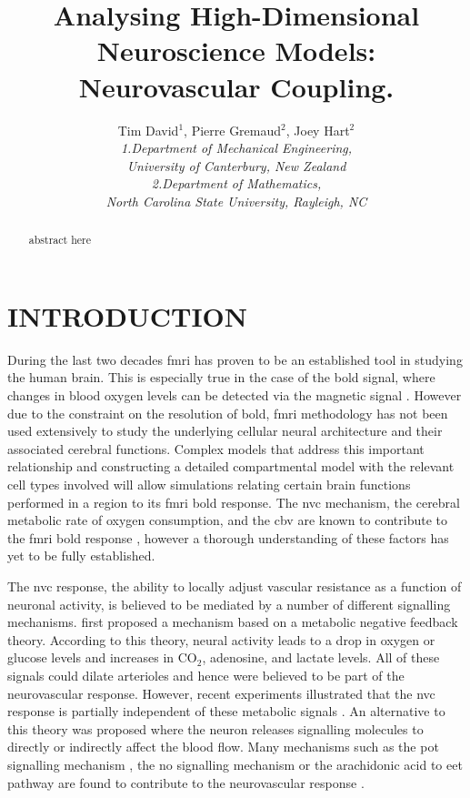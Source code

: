 \documentclass[12pt]{article}
\numberwithin{equation}{section}
\begin{document}
\title{Analysing High-Dimensional Neuroscience Models: Neurovascular Coupling. }
\author{ Tim David$^{1}$, Pierre Gremaud$^{2}$, Joey Hart$^{2}$\\
\textit{1.Department of Mechanical Engineering,} \\
\textit{University of Canterbury, New Zealand}\\
\textit{2.Department of Mathematics,}\\
\textit{North Carolina State University, Rayleigh, NC}\\
}
\maketitle
\thispagestyle{empty}

\begin{abstract}
abstract here 
\end{abstract}
\section{INTRODUCTION}
During the last two decades \gls{fmri} has proven to be an established tool in studying the human brain. This is especially true in the case of the \gls{bold} signal, where changes in blood oxygen levels can be detected via the magnetic signal  \cite{Ogawa1990}. However due to the constraint on the resolution of \gls{bold}, \gls{fmri} methodology has not been used extensively to study the underlying cellular neural architecture and their associated cerebral functions. Complex models that address this important relationship and constructing a detailed compartmental model with the relevant cell types involved will allow simulations relating certain brain functions performed in a region to its \gls{fmri} \gls{bold} response. The \gls{nvc} mechanism, the cerebral metabolic rate of oxygen consumption, and the \gls{cbv} are known to contribute to the \gls{fmri} \gls{bold} response \citep{Buxton2004}, however a thorough understanding of these factors has yet to be fully established.

The \gls{nvc} response, the ability to locally adjust vascular resistance as a function of neuronal activity, is believed to be mediated by a number of different signalling mechanisms. \citet{Roy1890} first proposed a  mechanism based on a metabolic negative feedback theory. According to this theory, neural activity leads to a drop in oxygen or glucose levels and increases in CO$_2$, adenosine, and lactate levels. All of these signals could dilate arterioles and hence were believed to be part of the neurovascular response. However, recent experiments illustrated that the \gls{nvc} response is partially independent of these metabolic signals \citep{Leithner2010, Lindauer2010, Mintun2001, Powers1996, Makani2010}. An alternative to this theory was proposed where the neuron releases signalling molecules to directly or indirectly affect the blood flow. Many mechanisms such as the \gls{pot} signalling mechanism \cite{Filosa2006}, the \gls{no} signalling mechanism or the arachidonic acid to \gls{eet} pathway are found to contribute to the neurovascular response \citep{Attwell2010}.
\end{document}
